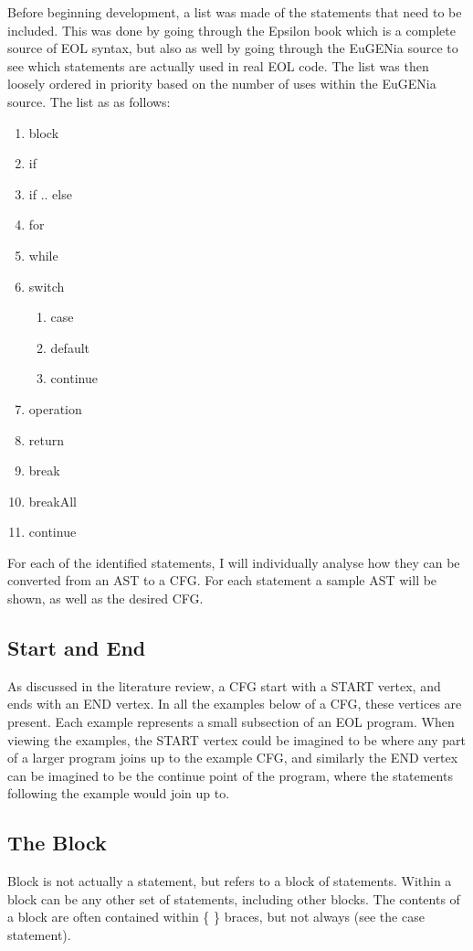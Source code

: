 Before beginning development, a list was made of the statements that need to be included. This was done by going through the Epsilon book \citep{epsilonBook} which is a complete source of EOL syntax, but also as well by going through the EuGENia source to see which statements are actually used in real EOL code. The list was then loosely ordered in priority based on the number of uses within the EuGENia source. The list as as follows:

\begin{enumerate}[nolistsep]
\item block
\item if
\item if .. else
\item for
\item while
\item switch
	\begin{enumerate}
	\item case
	\item default
	\item continue
	\end{enumerate}
\item operation
\item return
\item break
\item breakAll
\item continue
\end{enumerate}

For each of the identified statements, I will individually analyse how they can be converted from an AST to a CFG. For each statement a sample AST will be shown, as well as the desired CFG.

\subsection{Start and End}
As discussed in the literature review, a CFG start with a START vertex, and ends with an END vertex. In all the examples below of a CFG, these vertices are present. Each example represents a small subsection of an EOL program. When viewing the examples, the START vertex could be imagined to be where any part of a larger program joins up to the example CFG, and similarly the END vertex can be imagined to be the continue point of the program, where the statements following the example would join up to.

\subsection{The Block}
Block is not actually a statement, but refers to a block of statements. Within a block can be any other set of statements, including other blocks. The contents of a block are often contained within \{ \} braces, but not always (see the case statement).

